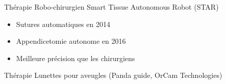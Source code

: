 \begin{frame}{Thérapie}
  Robo-chirurgien Smart Tissue Autonomous Robot (STAR)
  \begin{itemize}
    \item Sutures automatiques en 2014
    \item Appendicetomie autonome en 2016
    \item Meilleure précision que les chirurgiens
    \end{itemize}
\end{frame}

\begin{frame}{Thérapie}
  Lunettes pour aveugles (Panda guide, OrCam Technologies)
\end{frame}
